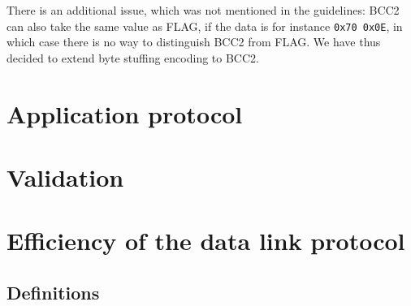 \documentclass[a4paper, 11pt]{report}
\begin{document}
There is an additional issue, which was not mentioned in the guidelines: BCC2 can also take the same value as FLAG, if the data is for instance \texttt{0x70 0x0E}, in which case there is no way to distinguish BCC2 from FLAG. We have thus decided to extend byte stuffing encoding to BCC2.

\section{Application protocol} \label{sec:AppProtocol}

\section{Validation} \label{sec:Validation}

\section{Efficiency of the data link protocol} \label{sec:Efficiency}

\subsection{Definitions}
\end{document}
